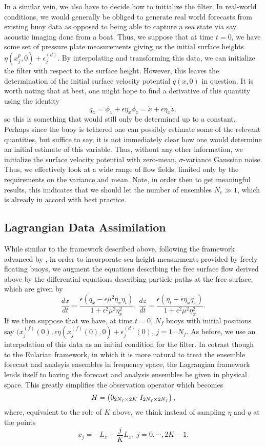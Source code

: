 In a similar vein, we also have to decide how to initialize the filter.  In real-world conditions, we would generally be obliged to generate real world forecasts from existing buoy data as opposed to being able to capture a sea state via say acoustic imaging done from a boat.  Thus, we suppose that at time $t=0$, we have some set of pressure plate measurements giving us the initial surface heights $\eta(x_{j}^{p},0) + \epsilon^{(d)}_{j}$.  By interpolating and transforming this data, we can initialize the filter with respect to the surface height.  However, this leaves the determination of the initial surface velocity potential $q(x,0)$ in question.  It is worth noting that at best, one might hope to find a derivative of this quantity using the identity
\[
q_{x} = \phi_{x} + \epsilon \eta_{x}\phi_{z} = \dot{x} + \epsilon \eta_{x}\dot{z},
\]
so this is something that would still only be determined up to a constant.  Perhaps since the buoy is tethered one can possibly estimate some of the relevant quantities, but suffice to say, it is not immediately clear how one would determine an initial estimate of this variable.  Thus, without any other information, we initialize the surface velocity potential with zero-mean, $\sigma$-variance Gaussian noise.  Thus, we effectively look at a wide range of flow fields, limited only by the requirements on the variance and mean.  Note, in order then to get meaningful results, this inidicates that we should let the number of ensembles $N_{e}\gg1$, which is already in accord with best practice.  

\subsection*{Lagrangian Data Assimilation}

While similar to the framework described above, following the framework advanced by \cite{jones1,jones2}, in order to incorporate sea height measurments provided by freely floating buoys, we augment the equations describing the free surface flow derived above by the differential equations describing particle paths at the free surface, which are given by 
\[
\frac{dx}{dt} = \frac{\epsilon\left(q_{x}-\epsilon\mu^{2}\eta_{x}\eta_{t}\right)}{1 + \epsilon^{2}\mu^{2}\eta_{x}^{2}}, ~ \frac{dz}{dt} = \frac{\epsilon\left(\eta_{t}+\epsilon \eta_{x} q_{x}\right)}{1 + \epsilon^{2}\mu^{2}\eta_{x}^{2}}. 
\]
If we then suppose that we have, at time $t=0$, $N_{f}$ buoys with initial positions say $(x^{(f)}_{j}(0),\epsilon \eta(x^{(f)}_{j}(0),0) + \epsilon_{j}^{(d)}(0)$, $j=1\cdots N_{f}$.  As before, we use an interpolation of this data as an initial condition for the filter.  In cotrast though to the Eularian framework, in which it is more natural to treat the ensemble forecast and analsyis ensembles in frequency space, the Lagrangian framework lends itself to having the forecast and analysis ensembles be given in physical space.  This greatly simplifies the observation operator which becomes 
\[
H = \begin{pmatrix} 0_{2N_{f}\times 2K} ~I_{2N_{f}\times 2N_{f}} \end{pmatrix},
\]
where, equivalent to the role of $K$ above, we think instead of sampling $\eta$ and $q$ at the points 
\[
x_{j} = -L_{x} + \frac{j}{K}L_{x}, ~ j=0,\cdots,2K-1.
\]